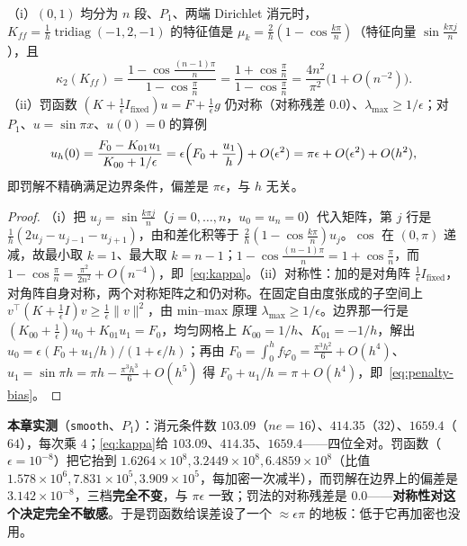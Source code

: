 \begin{theorem}
\label{thm:bc}
（i）$(0,1)$ 均分为 $n$ 段、$P_1$、两端 Dirichlet 消元时，$K_{ff}=\frac1h\operatorname{tridiag}(-1,2,-1)$
的特征值是 $\mu_k=\frac2h(1-\cos\frac{k\pi}n)$（特征向量 $\sin\frac{k\pi j}n$），且
\begin{equation}
  \kappa_2(K_{ff})=\frac{1-\cos\frac{(n-1)\pi}n}{1-\cos\frac{\pi}n}
  =\frac{1+\cos\frac{\pi}n}{1-\cos\frac{\pi}n}=\frac{4n^2}{\pi^2}\bigl(1+O(n^{-2})\bigr).
  \label{eq:kappa}
\end{equation}
（ii）罚函数 $(K+\frac1\epsilon I_{\text{fixed}})u=F+\frac1\epsilon g$ 仍对称（对称残差
$0.0$）、$\lambda_{\max}\ge1/\epsilon$；对 $P_1$、$u=\sin\pi x$、$u(0)=0$ 的算例
\begin{equation}
  u_h(0)=\frac{F_0-K_{01}u_1}{K_{00}+1/\epsilon}
  =\epsilon\Bigl(F_0+\frac{u_1}h\Bigr)+O(\epsilon^2)=\pi\epsilon+O(\epsilon^2)+O(h^2),
  \label{eq:penalty-bias}
\end{equation}
即罚解不精确满足边界条件，偏差是 $\pi\epsilon$，与 $h$ 无关。
\end{theorem}
\begin{proof}
（i）把 $u_j=\sin\frac{k\pi j}n$（$j=0,\dots,n$，$u_0=u_n=0$）代入矩阵，第 $j$ 行是
$\frac1h(2u_j-u_{j-1}-u_{j+1})$，由和差化积等于 $\frac2h(1-\cos\frac{k\pi}n)u_j$。$\cos$ 在 $(0,\pi)$
递减，故最小取 $k=1$、最大取 $k=n-1$；$1-\cos\frac{(n-1)\pi}n=1+\cos\frac{\pi}n$，而
$1-\cos\frac{\pi}n=\frac{\pi^2}{2n^2}+O(n^{-4})$，即~\eqref{eq:kappa}。（ii）对称性：加的是对角阵 $\frac1\epsilon I_{\text{fixed}}$，对角阵自身对称，两个对称矩阵之和仍对称。在固定自由度张成的子空间上
$v^{\top}(K+\frac1\epsilon I)v\ge\frac1\epsilon\|v\|^2$，由 min--max 原理
$\lambda_{\max}\ge1/\epsilon$。边界那一行是 $(K_{00}+\frac1\epsilon)u_0+K_{01}u_1=F_0$，均匀网格上
$K_{00}=1/h$、$K_{01}=-1/h$，解出 $u_0=\epsilon(F_0+u_1/h)/(1+\epsilon/h)$；再由
$F_0=\int_0^hf\varphi_0=\frac{\pi^3h^2}6+O(h^4)$、$u_1=\sin\pi h=\pi h-\frac{\pi^3h^3}6+O(h^5)$ 得
$F_0+u_1/h=\pi+O(h^4)$，即~\eqref{eq:penalty-bias}。
\end{proof}

\textbf{本章实测}（\texttt{smooth}、$P_1$）：消元条件数 $103.09$（$ne=16$）、$414.35$（$32$）、$1659.4$（$64$），每次乘
$4$；\eqref{eq:kappa}给 $103.09$、$414.35$、$1659.4$——四位全对。罚函数（$\epsilon=10^{-8}$）把它抬到
$1.6264\times10^8,3.2449\times10^8,6.4859\times10^8$（比值
$1.578\times10^6,7.831\times10^5,3.909\times10^5$，每加密一次减半），而罚解在边界上的偏差是
$3.142\times10^{-8}$，三档\textbf{完全不变}，与 $\pi\epsilon$ 一致；罚法的对称残差是
$0.0$——\textbf{对称性对这个决定完全不敏感}。于是罚函数给误差设了一个 $\approx\epsilon\pi$ 的地板：低于它再加密也没用。

